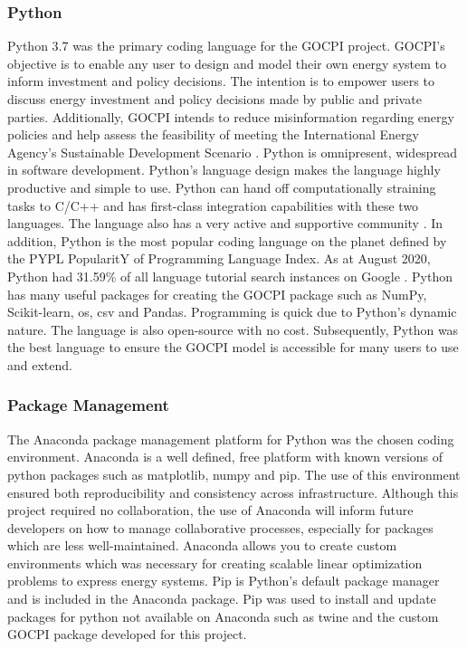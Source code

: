 \documentclass[10pt]{article}
\begin{document}
\subsubsection{Python}\label{python}
Python 3.7 was the primary coding language for the GOCPI project. 
GOCPI's objective is to enable any user to design and model their own energy system to inform investment and policy decisions.
The intention is to empower users to discuss energy investment and policy decisions made by public and private parties.
Additionally, GOCPI intends to reduce misinformation regarding energy policies and help assess the feasibility of meeting the International Energy Agency's Sustainable Development Scenario \cite{IEA_WEM}.
Python is omnipresent, widespread in software development. 
Python's language design makes the language highly productive and simple to use. 
Python can hand off computationally straining tasks to C/C++ and has first-class integration capabilities with these two languages.
The language also has a very active and supportive community \cite{Python_Features}.
In addition, Python is the most popular coding language on the planet defined by the PYPL PopularitY of Programming Language Index. 
As at August 2020, Python had 31.59\% of all language tutorial search instances on Google \cite{PYPL_Pop}.
Python has many useful packages for creating the GOCPI package such as NumPy, Scikit-learn, os, csv and Pandas. 
Programming is quick due to Python's dynamic nature.
The language is also open-source with no cost.
Subsequently, Python was the best language to ensure the GOCPI model is accessible for many users to use and extend.

\subsubsection{Package Management}
The Anaconda package management platform for Python \cite{Anaconda} was the chosen coding environment.
Anaconda is a well defined, free platform with known versions of python packages such as matplotlib, numpy and pip.
The use of this environment ensured both reproducibility and consistency across infrastructure.
Although this project required no collaboration, the use of Anaconda will inform future developers on how to manage collaborative processes, especially for packages which are less well-maintained. Anaconda allows you to create custom environments which was necessary for creating scalable linear optimization problems to express energy systems.
Pip is Python's default package manager and is included in the Anaconda package. 
Pip was used to install and update packages for python not available on Anaconda such as twine and the custom GOCPI package developed for this project.
\end{document}
